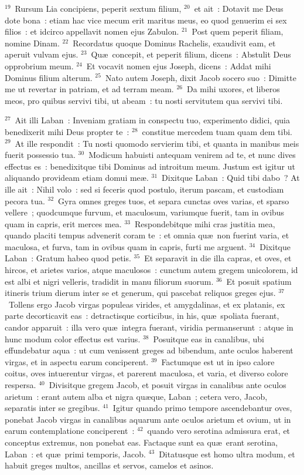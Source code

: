${}^{19}$~Rursum Lia concipiens, peperit sextum filium,
${}^{20}$~et ait~: Dotavit me Deus dote bona~: etiam hac vice mecum erit maritus meus, eo quod genuerim ei sex filios~: et idcirco appellavit nomen ejus Zabulon.
${}^{21}$~Post quem peperit filiam, nomine Dinam.
${}^{22}$~Recordatus quoque Dominus Rachelis, exaudivit eam, et aperuit vulvam ejus.
${}^{23}$~Qu\ae\ concepit, et peperit filium, dicens~: Abstulit Deus opprobrium meum.
${}^{24}$~Et vocavit nomen ejus Joseph, dicens~: Addat mihi Dominus filium alterum.
${}^{25}$~Nato autem Joseph, dixit Jacob socero suo~: Dimitte me ut revertar in patriam, et ad terram meam.
${}^{26}$~Da mihi uxores, et liberos meos, pro quibus servivi tibi, ut abeam~: tu nosti servitutem qua servivi tibi.


${}^{27}$~Ait illi Laban~: Inveniam gratiam in conspectu tuo, experimento didici, quia benedixerit mihi Deus propter te~:
${}^{28}$~constitue mercedem tuam quam dem tibi.
${}^{29}$~At ille respondit~: Tu nosti quomodo servierim tibi, et quanta in manibus meis fuerit possessio tua.
${}^{30}$~Modicum habuisti antequam venirem ad te, et nunc dives effectus es~: benedixitque tibi Dominus ad introitum meum. Justum est igitur ut aliquando provideam etiam domui me\ae .
${}^{31}$~Dixitque Laban~: Quid tibi dabo~? At ille ait~: Nihil volo~: sed si feceris quod postulo, iterum pascam, et custodiam pecora tua.
${}^{32}$~Gyra omnes greges tuos, et separa cunctas oves varias, et sparso vellere~; quodcumque furvum, et maculosum, variumque fuerit, tam in ovibus quam in capris, erit merces mea.
${}^{33}$~Respondebitque mihi cras justitia mea, quando placiti tempus advenerit coram te~: et omnia qu\ae\ non fuerint varia, et maculosa, et furva, tam in ovibus quam in capris, furti me arguent.
${}^{34}$~Dixitque Laban~: Gratum habeo quod petis.
${}^{35}$~Et separavit in die illa capras, et oves, et hircos, et arietes varios, atque maculosos~: cunctum autem gregem unicolorem, id est albi et nigri velleris, tradidit in manu filiorum suorum.
${}^{36}$~Et posuit spatium itineris trium dierum inter se et generum, qui pascebat reliquos greges ejus.
${}^{37}$~Tollens ergo Jacob virgas populeas virides, et amygdalinas, et ex platanis, ex parte decorticavit eas~: detractisque corticibus, in his, qu\ae\ spoliata fuerant, candor apparuit~: illa vero qu\ae\ integra fuerant, viridia permanserunt~: atque in hunc modum color effectus est varius.
${}^{38}$~Posuitque eas in canalibus, ubi effundebatur aqua~: ut cum venissent greges ad bibendum, ante oculos haberent virgas, et in aspectu earum conciperent.
${}^{39}$~Factumque est ut in ipso calore coitus, oves intuerentur virgas, et parerent maculosa, et varia, et diverso colore respersa.
${}^{40}$~Divisitque gregem Jacob, et posuit virgas in canalibus ante oculos arietum~: erant autem alba et nigra qu\ae que, Laban~; cetera vero, Jacob, separatis inter se gregibus.
${}^{41}$~Igitur quando primo tempore ascendebantur oves, ponebat Jacob virgas in canalibus aquarum ante oculos arietum et ovium, ut in earum contemplatione conciperent~:
${}^{42}$~quando vero serotina admissura erat, et conceptus extremus, non ponebat eas. Factaque sunt ea qu\ae\ erant serotina, Laban~: et qu\ae\ primi temporis, Jacob.
${}^{43}$~Ditatusque est homo ultra modum, et habuit greges multos, ancillas et servos, camelos et asinos.

